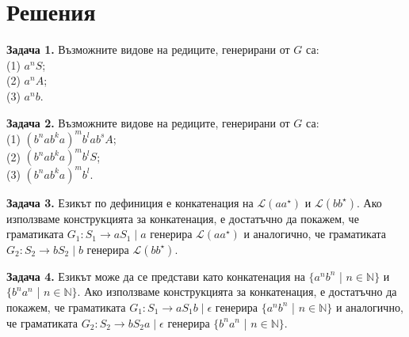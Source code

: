 \documentclass{article}
\begin{document}
\section{Решения}
    \textbf{Задача 1.} Възможните видове на редиците, генерирани от $G$ са: \\
    (1) $a^nS$; \\
    (2) $a^nA$; \\
    (3) $a^nb$.

    \vspace{15pt} 

    \textbf{Задача 2.} Възможните видове на редиците, генерирани от $G$ са: \\
    (1) $(b^nab^ka)^mb^lab^sA$; \\
    (2) $(b^nab^ka)^mb^lS$; \\
    (3) $(b^nab^ka)^mb^l$. \\
    
    \vspace{15pt}

    \textbf{Задача 3.} Езикът по дефиниция е конкатенация на $\mathscr{L}(aa^{\star})$
    и $\mathscr{L}(bb^{\star})$. Ако използваме конструкцията за конкатенация, е достатъчно
    да покажем, че граматиката $G_1 : \boxed{S_1 \rightarrow aS_1 \; | \; a}$ генерира
    $\mathscr{L}(aa^{\star})$ и аналогично, че граматиката $G_2 : \boxed{S_2 \rightarrow bS_2 \; | \; b}$
    генерира $\mathscr{L}(bb^{\star})$.

    \vspace{15pt}

    \textbf{Задача 4.} 
    Езикът може да се представи като конкатенация на $\{a^nb^n$ | $n \in \mathbb{N}\}$
    и $\{b^na^n$ | $n \in \mathbb{N}\}$. Ако използваме конструкцията за конкатенация, е достатъчно
    да покажем, че граматиката $G_1 : \boxed{S_1 \rightarrow aS_1b \; | \; \epsilon }$ генерира
    $\{a^nb^n$ | $n \in \mathbb{N}\}$ и аналогично, че граматиката $G_2 : \boxed{S_2 \rightarrow bS_2a \; | \; \epsilon}$
    генерира $\{b^na^n$ | $n \in \mathbb{N}\}$.
\end{document}
